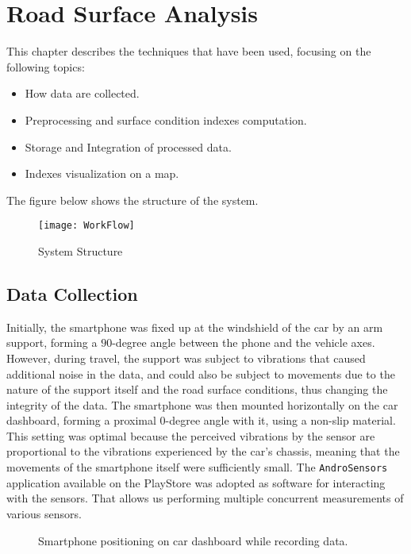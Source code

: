 \documentclass[tesi]{subfiles}
\begin{document}
\chapter{Road Surface Analysis}
\label{ch:System Development}
This chapter describes the techniques that have been used, focusing on the following topics:

\begin{itemize}
\item How data are collected.
\item Preprocessing and surface condition indexes computation.
\item Storage and Integration of processed data.
\item Indexes visualization on a map.
\end{itemize}

The figure below shows the structure of the system.
\begin{figure}[H]
\centering
\texttt{[image: WorkFlow]}
\caption{System Structure}

\end{figure}\label{fig:System Structure}

\section{Data Collection}\label{sc:Data Collect}
Initially, the smartphone was fixed up at the windshield of the car by an arm support, forming a $90$-degree angle between the phone and the vehicle axes.
However, during travel, the support was subject to vibrations that caused additional noise in the data, and could also be subject to movements due to the nature of the support itself and the road surface conditions, thus changing the integrity of the data.
The smartphone was then mounted horizontally on the car dashboard, forming a proximal $0$-degree angle with it, using a non-slip material. This setting was optimal because the perceived vibrations by the sensor are proportional to the vibrations experienced by the car's chassis, meaning that the movements of the smartphone itself were sufficiently small.
The \texttt{AndroSensors} application available on the PlayStore was adopted as software for interacting with the sensors. That allows us  performing multiple concurrent measurements of various sensors.

\begin{figure}[H]
 \centering

  
  
  \caption{Smartphone positioning on car dashboard while recording data.}
\end{figure}\label{fig:Smarphone Data Recording}
\end{document}
